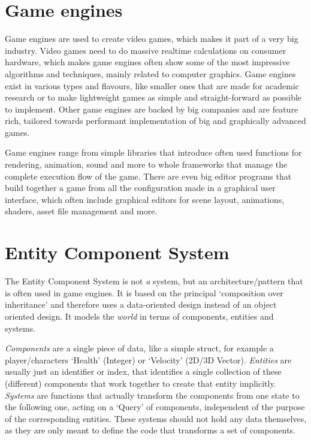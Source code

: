 \label{chap:introduction}

\section{Game engines}

Game engines are used to create video games, which makes it part of a very big industry. Video games need to do massive realtime calculations on consumer hardware, which makes game engines often show some of the most impressive algorithms and techniques, mainly related to computer graphics. Game engines exist in various types and flavours, like smaller ones that are made for academic research or to make lightweight games as simple and straight-forward as possible to implement. Other game engines are backed by big companies and are feature rich, tailored towards performant implementation of big and graphically advanced games.

Game engines range from simple libraries that introduce often used functions for rendering, animation, sound and more to whole frameworks that manage the complete execution flow of the game. There are even big editor programs that build together a game from all the configuration made in a graphical user interface, which often include graphical editors for scene layout, animations, shaders, asset file management and more.

\section{Entity Component System}

The Entity Component System is not \textit{a} system, but an architecture/pattern that is often used in game engines. It is based on the principal `composition over inheritance' and therefore uses a data-oriented design instead of an object oriented design. It models the \textit{world} in terms of components, entities and systems.

\textit{Components} are a single piece of data, like a simple struct, for example a player/characters `Health' (Integer) or `Velocity' (2D/3D Vector). \textit{Entities} are usually just an identifier or index, that identifies a single collection of these (different) components that work together to create that entity implicitly. \textit{Systems} are functions that actually transform the components from one state to the following one, acting on a `Query' of components, independent of the purpose of the corresponding entities. These systems should not hold any data themselves, as they are only meant to define the code that transforms a set of components.

